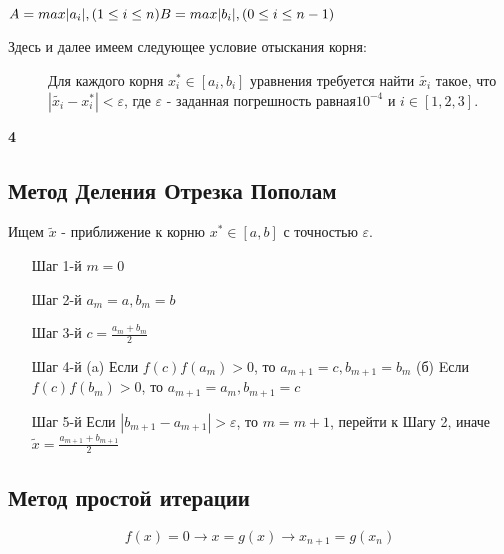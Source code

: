 \documentclass[a4paper,12pt]{article}
\begin{document}
\begin{center}
    $A = max{|a_i|},    (1 \le i \le n) \\
    B = max{|b_i|},     (0 \le i \le n-1)$
\end{center}

\vspace{1cm}



\vspace{0.5cm}\begin{description}
\item[Здесь и далее имеем следующее условие отыскания корня:]
 Для каждого корня $x_i^* \in [a_i,b_i]$ уравнения требуется найти $\tilde{x_i}$ такое, что $|\tilde{x_i} - x_i^*| < \varepsilon$, где $\varepsilon$ - заданная погрешность равная$ 10^{-4}$ и $i \in [1,2,3]$.
\end{description}
\newpage

\begin{center}
{\bf4}\\
\vspace{0.5cm}
\end{center}
\setcounter{page}{4}
\subsection{Метод Деления Отрезка Пополам}\label{bisection}
Ищем $\tilde{x}$ - приближение к корню $x^* \in [a, b]$ с точностью $\varepsilon$.

\begin{itemize}
    \item[Шаг 1-й] $ m = 0 $
    \item[Шаг 2-й] $ a_m = a, b_m = b $
    \item[Шаг 3-й] $ c= \frac{a_m + b_m}{2} $
    \item[Шаг 4-й] (a) Если $f(c)f(a_m) > 0$, то $a_{m+1} = c, b_{m+1} = b_m$
        (б) Eсли $f(c)f(b_m) > 0$, то $a_{m+1} = a_m, b_{m+1} = c$
    \item[Шаг 5-й] Если $|b_{m+1} - a_{m+1}| > \varepsilon$, то $m = m + 1$, перейти к Шагу 2, иначе $\tilde{x} = \frac{a_{m+1} + b_{m+1}}{2}$
\end{itemize}


\subsection{Метод простой итерации}\label{msi}
\begin{equation}
f(x) = 0 \to x = g(x) \to x_{n+1} = g(x_n)
\label{eqn:emsi}
\end{equation}
\end{document}
